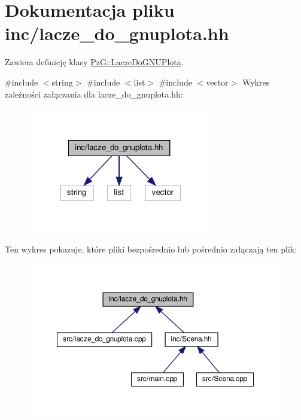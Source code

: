 \hypertarget{lacze__do__gnuplota_8hh}{}\section{Dokumentacja pliku inc/lacze\+\_\+do\+\_\+gnuplota.hh}
\label{lacze__do__gnuplota_8hh}


Zawiera definicję klasy \hyperlink{classPzG_1_1LaczeDoGNUPlota}{Pz\+G\+::\+Lacze\+Do\+G\+N\+U\+Plota}.  


{\ttfamily \#include $<$string$>$}\newline
{\ttfamily \#include $<$list$>$}\newline
{\ttfamily \#include $<$vector$>$}\newline
Wykres zależności załączania dla lacze\+\_\+do\+\_\+gnuplota.\+hh\+:\nopagebreak
\begin{figure}[H]
\begin{center}
\leavevmode
\includegraphics[width=231pt]{lacze__do__gnuplota_8hh__incl}
\end{center}
\end{figure}
Ten wykres pokazuje, które pliki bezpośrednio lub pośrednio załączają ten plik\+:\nopagebreak
\begin{figure}[H]
\begin{center}
\leavevmode
\includegraphics[width=350pt]{lacze__do__gnuplota_8hh__dep__incl}
\end{center}
\end{figure}
